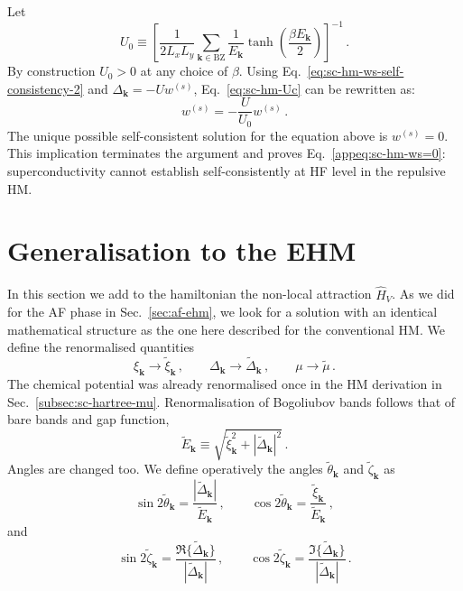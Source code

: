 \begin{tabproof}[Proof of Eq.~\eqref{appeq:sc-hm-ws=0}: impossibility of $s$-wave superconductivity in the conventional HM]
	
	Let
	\begin{equation}\label{eq:sc-hm-Uc}
		U_0 \equiv \left[
		\frac{1}{2 L_x L_y} \sum_{\mathbf{k}\in\mathrm{BZ}} \frac{1}{E_\mathbf{k}} \tanh(\frac{\beta E_\mathbf{k}}{2})
		\right]^{-1} \, .
	\end{equation}
	By construction $U_0 > 0$ at any choice of $\beta$. Using
	Eq.~\eqref{eq:sc-hm-ws-self-consistency-2} and $\Delta_\mathbf{k} = -U w^{(s)}$, Eq.~\eqref{eq:sc-hm-Uc} can be rewritten as:
	\[
	w^{(s)} = -\frac{U}{U_0} w^{(s)} \, .
	\]
	The unique possible self-consistent solution for the equation above is $w^{(s)}=0$. This implication terminates the argument and proves Eq.~\eqref{appeq:sc-hm-ws=0}: superconductivity cannot establish self-consistently at HF level in the repulsive HM. 
\end{tabproof}

\section{Generalisation to the EHM}\label{sec:sc-ehm}

In this section we add to the hamiltonian the non-local attraction $\hat H_V$. As we did for the AF phase in Sec.~\ref{sec:af-ehm}, we look for a solution with an identical mathematical structure as the one here described for the conventional HM. We define the renormalised quantities
\[
\xi_\mathbf{k} \to \tilde{\xi}_\mathbf{k} \, ,
\qquad
\Delta_\mathbf{k} \to \tilde{\Delta}_\mathbf{k} \, ,
\qquad
\mu \to \tilde{\mu} \, .
\]
The chemical potential was already renormalised once in the HM derivation in Sec.~\ref{subsec:sc-hartree-mu}. Renormalisation of Bogoliubov bands follows that of bare bands and gap function, 
\[
\tilde{E}_\mathbf{k} \equiv \sqrt{\tilde{\xi}_\mathbf{k}^2 + |\tilde{\Delta}_\mathbf{k}|^2} \, .
\]
Angles are changed too. We define operatively the angles $\tilde{\theta}_\mathbf{k}$ and $\tilde{\zeta}_\mathbf{k}$ as
\begin{equation}\label{eq:sc-ehm-(~theta)}
	\sin 2\tilde{\theta}_\mathbf{k} = \frac{|\tilde{\Delta}_\mathbf{k}|}{\tilde{E}_\mathbf{k}} \, ,
	\qquad
	\cos 2\tilde{\theta}_\mathbf{k} = \frac{\tilde{\xi}_\mathbf{k}}{\tilde{E}_\mathbf{k}} \, ,
\end{equation}
and
\begin{equation}\label{eq:sc-ehm-(~zeta)}
	\sin 2\tilde{\zeta}_\mathbf{k} = \frac{\Re\{\tilde{\Delta}_\mathbf{k}\}}{|\tilde{\Delta}_\mathbf{k}|} \, ,
	\qquad
	\cos 2\tilde{\zeta}_\mathbf{k} = \frac{\Im\{\tilde{\Delta}_\mathbf{k}\}}{|\tilde{\Delta}_\mathbf{k}|} \, .
\end{equation}

